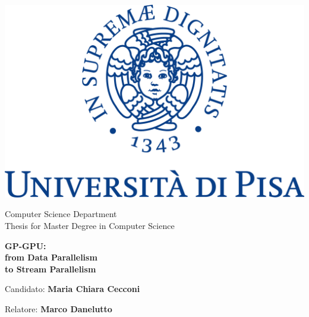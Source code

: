 
\begin{titlepage}
	\begin{center}	
		\includegraphics{images/logo_unipi}
		
		\vspace*{1cm}
		\normalsize{					
			Computer Science Department\\
			\vspace{0.5cm}		
			Thesis for Master Degree in Computer Science
		}
		\vspace*{1 cm}
		
		
		\huge{ \textbf{GP-GPU: \\  from 	 Data Parallelism \\ to Stream  Parallelism} }
		
		
		
		\vspace{1.0cm}
	\end{center}
	
	\vfill
	\vspace*{1.5cm}
	
	\begin{flushright}
		\Large{	
			Candidato: \textbf{Maria Chiara Cecconi}
			
			\vspace{0.5cm}
			
			Relatore: \textbf{Marco Danelutto}
		}
	\end{flushright}				
\end{titlepage}
%	